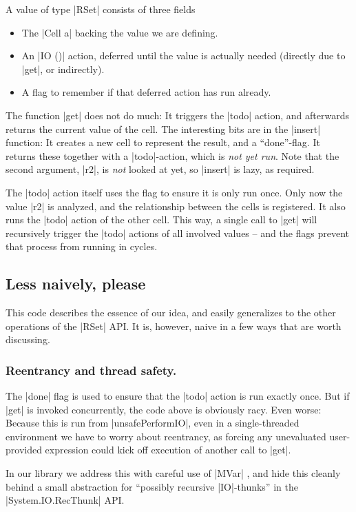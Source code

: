 \documentclass[manuscript,anonymous,screen,acmsmall]{acmart}
\begin{document}
A value of type |RSet| consists of three fields
\begin{itemize}
\item The |Cell a| backing the value we are defining.
\item An |IO ()| action, deferred until the value is actually needed (directly due to |get|, or indirectly).
\item A flag to remember if that deferred action has run already.
\end{itemize}

The function |get| does not do much: It triggers the |todo| action, and afterwards returns the current value of the cell. The interesting bits are in the |insert| function: It creates a new cell to represent the result, and a “done”-flag. It returns these together with a |todo|-action, which is \emph{not yet run}. Note that the second argument, |r2|, is \emph{not} looked at yet, so |insert| is lazy, as required.

The |todo| action itself uses the flag to ensure it is only run once. Only now the value |r2| is analyzed, and the relationship between the cells is registered. It also runs the |todo| action of the other cell. This way, a single call to |get| will recursively trigger the |todo| actions of all involved values -- and the flags prevent that process from running in cycles.

\subsection{Less naively, please}

This code describes the essence of our idea, and easily generalizes to the other operations of the |RSet| API. It is, however, naive in a few ways that are worth discussing.

\subsubsection{Reentrancy and thread safety.}\label{sec:thread}

The |done| flag is used to ensure that the |todo| action is run exactly once. But if |get| is invoked concurrently, the code above is obviously racy. Even worse: Because this is run from |unsafePerformIO|, even in a single-threaded environment we have to worry about reentrancy, as forcing any unevaluated user-provided expression could kick off execution of another call to |get|.

In our library we address this with careful use of |MVar| \cite{concurrent}, and hide this cleanly behind a small abstraction for “possibly recursive |IO|-thunks” in the |System.IO.RecThunk| API.
\end{document}
